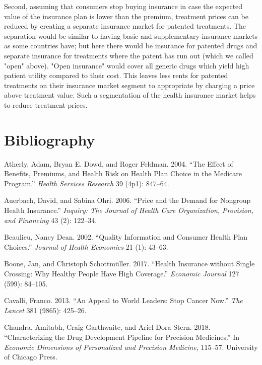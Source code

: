 \documentclass[a4paper,12pt]{article}
\begin{document}
Second, assuming that consumers stop buying insurance in case the expected value of the insurance plan is lower than the premium, treatment prices can be reduced by creating a separate insurance market for patented treatments. The separation would be similar to having basic and supplementary insurance markets as some countries have; but here there would be insurance for patented drugs and separate insurance for treatments  where the patent has run out (which we called "open" above). "Open insurance" would cover all generic drugs which yield high patient utility compared to their cost. This leaves less rents for patented treatments on their insurance market segment to appropriate by charging a price above treatment value. Such a segmentation of the health insurance market helps to reduce treatment prices.

\section{Bibliography}
\label{sec:org1d9b9af}

\hypertarget{citeproc_bib_item_1}{Atherly, Adam, Bryan E. Dowd, and Roger Feldman. 2004. “The Effect of Benefits, Premiums, and Health Risk on Health Plan Choice in the Medicare Program.” \textit{Health Services Research} 39 (4p1): 847–64.}

\hypertarget{citeproc_bib_item_2}{Auerbach, David, and Sabina Ohri. 2006. “Price and the Demand for Nongroup Health Insurance.” \textit{Inquiry: The Journal of Health Care Organization, Provision, and Financing} 43 (2): 122–34.}

\hypertarget{citeproc_bib_item_3}{Beaulieu, Nancy Dean. 2002. “Quality Information and Consumer Health Plan Choices.” \textit{Journal of Health Economics} 21 (1): 43–63.}

\hypertarget{citeproc_bib_item_4}{Boone, Jan, and Christoph Schottmüller. 2017. “Health Insurance without Single Crossing: Why Healthy People Have High Coverage.” \textit{Economic Journal} 127 (599): 84–105.}

\hypertarget{citeproc_bib_item_5}{Cavalli, Franco. 2013. “An Appeal to World Leaders: Stop Cancer Now.” \textit{The Lancet} 381 (9865): 425–26.}

\hypertarget{citeproc_bib_item_6}{Chandra, Amitabh, Craig Garthwaite, and Ariel Dora Stern. 2018. “Characterizing the Drug Development Pipeline for Precision Medicines.” In \textit{Economic Dimensions of Personalized and Precision Medicine}, 115–57. University of Chicago Press.}
\end{document}
